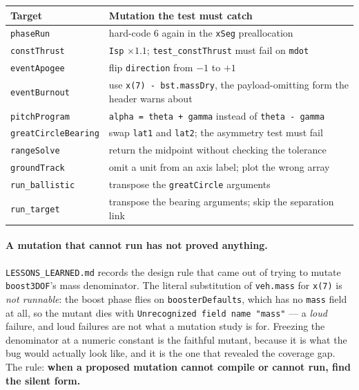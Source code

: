 \documentclass[11pt]{article}
\newcommand{\code}[1]{\texttt{#1}}
\begin{document}
\begin{center}
\begin{tabular}{lp{6.6cm}}
\toprule
Target & Mutation the test must catch \\
\midrule
\code{phaseRun}          & hard-code $6$ again in the \code{xSeg} preallocation \\
\code{constThrust}       & \code{Isp} $\times1.1$; \code{test\_constThrust} must fail on \code{mdot} \\
\code{eventApogee}       & flip \code{direction} from $-1$ to $+1$ \\
\code{eventBurnout}      & use \code{x(7) - bst.massDry}, the payload-omitting form the header warns about \\
\code{pitchProgram}      & \code{alpha = theta + gamma} instead of \code{theta - gamma} \\
\code{greatCircleBearing}& swap \code{lat1} and \code{lat2}; the asymmetry test must fail \\
\code{rangeSolve}        & return the midpoint without checking the tolerance \\
\code{groundTrack}       & omit a unit from an axis label; plot the wrong array \\
\code{run\_ballistic}    & transpose the \code{greatCircle} arguments \\
\code{run\_target}       & transpose the bearing arguments; skip the separation link \\
\bottomrule
\end{tabular}
\end{center}

\paragraph{A mutation that cannot run has not proved anything.}
\code{LESSONS\_LEARNED.md} records the design rule that came out of trying to
mutate \code{boost3DOF}'s mass denominator. The literal substitution of
\code{veh.mass} for \code{x(7)} is \emph{not runnable}: the boost phase flies
on \code{boosterDefaults}, which has no \code{mass} field at all, so the mutant
dies with \code{Unrecognized field name "mass"} --- a \emph{loud} failure, and
loud failures are not what a mutation study is for. Freezing the denominator at
a numeric constant is the faithful mutant, because it is what the bug would
actually look like, and it is the one that revealed the coverage gap. The rule:
\textbf{when a proposed mutation cannot compile or cannot run, find the silent
form.}
\end{document}
